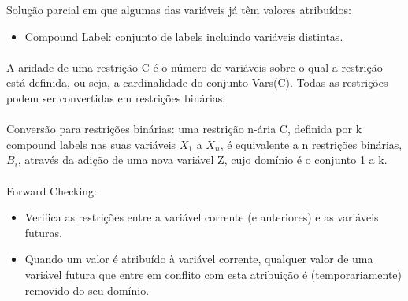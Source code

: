 \documentclass[../resumosPLOG.tex]{subfiles}
\begin{document}
Solução parcial em que algumas das variáveis já têm valores atribuídos:
\begin{itemize}
    \item Compound Label: conjunto de labels incluindo variáveis distintas.
\end{itemize}

\paragraph{}

A aridade de uma restrição C é o número de variáveis sobre o qual a restrição está definida, ou seja, a cardinalidade do conjunto Vars(C). 
Todas as restrições podem ser convertidas em restrições binárias.

\paragraph{}

Conversão para restrições binárias: uma restrição n-ária C, definida por k compound labels nas suas variáveis \(X_1\) a \(X_n\), é equivalente a n restrições binárias, \(B_i\), através da adição de uma nova variável Z, cujo domínio é o conjunto 1 a k.

\paragraph{}

Forward Checking:
\begin{itemize}
    \item Verifica as restrições entre a variável corrente (e anteriores) e as variáveis futuras.
    \item Quando um valor é atribuído à variável corrente, qualquer valor de uma variável futura que entre em conflito com esta atribuição é (temporariamente) removido do seu domínio.
\end{itemize}
\end{document}
